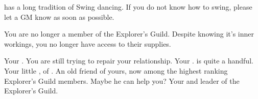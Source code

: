 \documentclass[char]{NeptuneBall}
\begin{document}
\begin{itemz}[Notes]
  \item \pAmerica{} has a long tradition of Swing dancing. If you do not know how to swing, please let a GM know as soon as possible.
  \item You are no longer a member of the Explorer's Guild. Despite knowing it's inner workings, you no longer have access to their supplies.
\end{itemz}

\begin{contacts}
  \contact{\cKing{}} Your \cKing{\parent}. You are still trying to repair your relationship.
  \contact{\cWillow{}} Your \cWillow{\offspring}. \cWillow{\They} is quite a handful.
  \contact{\cPrincess{}} Your little \cPrincess{\sibling}, \cPrincess{\prince} of \pAtlantis{}.
  \contact{\cPriest{}} An old friend of yours, now among the highest ranking Explorer's Guild members. Maybe he can help you?
  \contact{\cPlant{}} Your \cPlant{\uncle} and leader of the Explorer's Guild.
\end{contacts}
\end{document}
